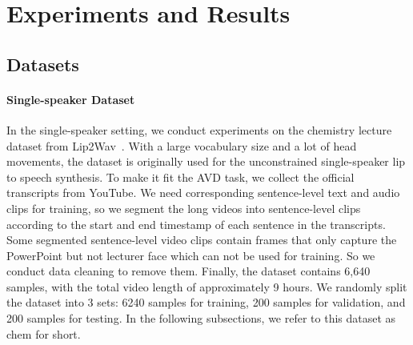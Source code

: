 \documentclass{article}
\begin{document}

\section{Experiments and Results}

\subsection{Datasets}
\label{sec:dataset}
\paragraph{Single-speaker Dataset}
In the single-speaker setting, we conduct experiments on the chemistry lecture dataset from Lip2Wav~\cite{prajwal2020learning}. With a large vocabulary size and a lot of head movements, the dataset is originally used for the unconstrained single-speaker lip to speech synthesis. 
To make it fit the AVD task, we collect the official transcripts from YouTube. 
We need corresponding sentence-level text and audio clips for training, so we segment the long videos into sentence-level clips according to the start and end timestamp of each sentence in the transcripts.
Some segmented sentence-level video clips contain frames that only capture the PowerPoint but not lecturer face which can not be used for training. So we conduct data cleaning to remove them.
Finally, the dataset contains 6,640 samples, with the total video length of approximately 9 hours. We randomly split the dataset into 3 sets: 6240 samples for training, 200 samples for validation, and 200 samples for testing. In the following subsections, we refer to this dataset as chem for short.
\end{document}

